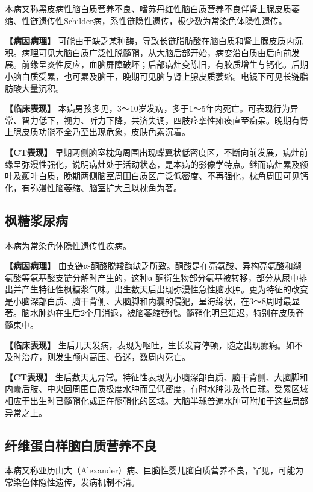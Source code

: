 本病又称黑皮病性脑白质营养不良、嗜苏丹红性脑白质营养不良伴肾上腺皮质萎缩、性链遗传性Schilder病，系性链隐性遗传，极少数为常染色体隐性遗传。

\textbf{【病因病理】}
可能由于缺乏某种酶，导致长链脂肪酸在脑白质和肾上腺皮质内沉积。病理可见大脑白质广泛性脱髓鞘，从大脑后部开始，病变沿白质由后向前发展。前缘呈炎性反应，血脑屏障破坏；后部病灶变陈旧，有胶质增生与钙化。后期小脑白质受累，也可累及脑干，晚期可见脑与肾上腺皮质萎缩。电镜下可见长链脂肪酸大量沉积。

\textbf{【临床表现】}
本病男孩多见，3～10岁发病，多于1～5年内死亡。可表现行为异常、智力低下，视力、听力下降，共济失调，四肢痉挛性瘫痪直至痴呆。晚期有肾上腺皮质功能不全乃至出现危象，皮肤色素沉着。

\textbf{【CT表现】}
早期两侧脑室枕角周围出现蝶翼状低密度区，不断向前发展，病灶前缘呈弥漫性强化，说明病灶处于活动状态，是本病的影像学特点。继而病灶累及额叶及颞叶白质，晚期两侧脑室周围白质区广泛低密度、不再强化，枕角周围可见钙化，有弥漫性脑萎缩、脑室扩大且以枕角为著。

\subsection{枫糖浆尿病}

本病为常染色体隐性遗传性疾病。

\textbf{【病因病理】}
由支链α-酮酸脱羧酶缺乏所致。酮酸是在亮氨酸、异构亮氨酸和缬氨酸等氨基酸支链分解时产生的，这种α-酮衍生物部分氨基被转移，部分从尿中排出并产生特征性枫糖浆气味。出生数天后出现弥漫性急性脑水肿。更为特征的改变是小脑深部白质、脑干背侧、大脑脚和内囊的侵犯，呈海绵状，在3～8周时最显著。脑水肿约在生后2个月消退，被脑萎缩替代。髓鞘化明显延迟，特别在皮质脊髓束中。

\textbf{【临床表现】}
生后几天发病，表现为呕吐，生长发育停顿，随之出现癫痫。如不及时治疗，则发生颅内高压、昏迷，数周内死亡。

\textbf{【CT表现】}
生后数天无异常。特征性表现为小脑深部白质、脑干背侧、大脑脚和内囊后肢、中央回周围白质极度水肿而呈低密度，有时水肿涉及苍白球。受累区域相应于出生时已髓鞘化或正在髓鞘化的区域。大脑半球普遍水肿可附加于这些局部异常之上。

\subsection{纤维蛋白样脑白质营养不良}

本病又称亚历山大（Alexander）病、巨脑性婴儿脑白质营养不良，罕见，可能为常染色体隐性遗传，发病机制不清。

